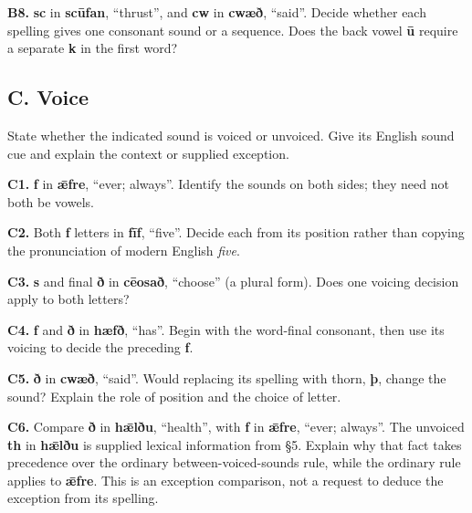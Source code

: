 \textbf{B8.} \textbf{sc} in \textbf{scūfan}, “thrust”, and \textbf{cw} in \textbf{cwæð}, “said”. Decide whether each spelling gives one consonant sound or a sequence. Does the back vowel \textbf{ū} require a separate \textbf{k} in the first word?

\subsection*{C. Voice}

State whether the indicated sound is voiced or unvoiced. Give its English sound cue and explain the context or supplied exception.

\textbf{C1.} \textbf{f} in \textbf{ǣfre}, “ever; always”. Identify the sounds on both sides; they need not both be vowels.

\textbf{C2.} Both \textbf{f} letters in \textbf{fīf}, “five”. Decide each from its position rather than copying the pronunciation of modern English \emph{five}.

\textbf{C3.} \textbf{s} and final \textbf{ð} in \textbf{cēosað}, “choose” (a plural form). Does one voicing decision apply to both letters?

\textbf{C4.} \textbf{f} and \textbf{ð} in \textbf{hæfð}, “has”. Begin with the word-final consonant, then use its voicing to decide the preceding \textbf{f}.

\textbf{C5.} \textbf{ð} in \textbf{cwæð}, “said”. Would replacing its spelling with thorn, \textbf{þ}, change the sound? Explain the role of position and the choice of letter.

\textbf{C6.} Compare \textbf{ð} in \textbf{hǣlðu}, “health”, with \textbf{f} in \textbf{ǣfre}, “ever; always”. The unvoiced \textbf{th} in \textbf{hǣlðu} is supplied lexical information from §5. Explain why that fact takes precedence over the ordinary between-voiced-sounds rule, while the ordinary rule applies to \textbf{ǣfre}. This is an exception comparison, not a request to deduce the exception from its spelling.

